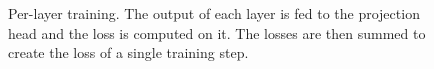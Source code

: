 \documentclass[11pt]{article}
\begin{document}
\begin{figure}%
	\centering
	\caption{Per-layer training. The output of each layer is fed to the projection head and the loss is computed on it. The losses are then summed to create the loss of a single training step.}
	\label{per-layer-training}
\end{figure}



\end{document}
